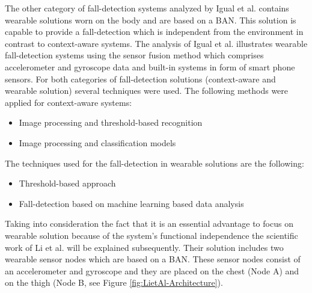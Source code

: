 \documentclass[review]{elsarticle}
\begin{document}
The other category of fall-detection systems analyzed by Igual et al. \cite{Igual2013} contains wearable solutions worn on the body and are based on a BAN. This solution is capable to provide a fall-detection which is independent from the environment in contrast to context-aware systems. The analysis of Igual et al. \cite{Igual2013} illustrates wearable fall-detection systems using the sensor fusion method which comprises accelerometer and gyroscope data and built-in systems in form of smart phone sensors. For both categories of fall-detection solutions (context-aware and wearable solution) several techniques were used. The following methods were applied for context-aware systems:
\begin{itemize}
	\item Image processing and threshold-based recognition
	\item Image processing and classification models
\end{itemize} 
The techniques used for the fall-detection in wearable solutions are the following:
\begin{itemize}
	\item Threshold-based approach
	\item Fall-detection based on machine learning based data analysis
\end{itemize}
Taking into consideration the fact that it is an essential advantage to focus on wearable solution because of the system's functional independence the scientific work of Li et al. \cite{Li2009} will be explained subsequently. Their solution includes two wearable sensor nodes which are based on a BAN. These sensor nodes consist of an accelerometer and gyroscope and they are placed on the chest (Node A) and on the thigh (Node B, see Figure \ref{fig:LietAl-Architecture}). 
\end{document}
